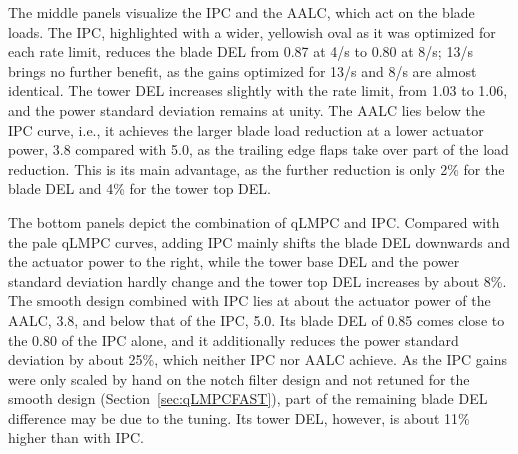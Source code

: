The middle panels visualize the IPC and the AALC, which act on the blade loads. The IPC, highlighted with a wider, yellowish oval as it was optimized for each rate limit, reduces the blade DEL from 0.87 at 4\textdegree/s to 0.80 at 8\textdegree/s; 13\textdegree/s brings no further benefit, as the gains optimized for 13\textdegree/s and 8\textdegree/s are almost identical. The tower DEL increases slightly with the rate limit, from 1.03 to 1.06, and the power standard deviation remains at unity. The AALC lies below the IPC curve, i.e., it achieves the larger blade load reduction at a lower actuator power, 3.8 compared with 5.0, as the trailing edge flaps take over part of the load reduction. This is its main advantage, as the further reduction is only 2\% for the blade DEL and 4\% for the tower top DEL.

The bottom panels depict the combination of qLMPC and IPC. Compared with the pale qLMPC curves, adding IPC mainly shifts the blade DEL downwards and the actuator power to the right, while the tower base DEL and the power standard deviation hardly change and the tower top DEL increases by about 8\%. The smooth design combined with IPC lies at about the actuator power of the AALC, 3.8, and below that of the IPC, 5.0. Its blade DEL of 0.85 comes close to the 0.80 of the IPC alone, and it additionally reduces the power standard deviation by about 25\%, which neither IPC nor AALC achieve. As the IPC gains were only scaled by hand on the notch filter design and not retuned for the smooth design (Section~\ref{sec:qLMPCFAST}), part of the remaining blade DEL difference may be due to the tuning. Its tower DEL, however, is about 11\% higher than with IPC.

